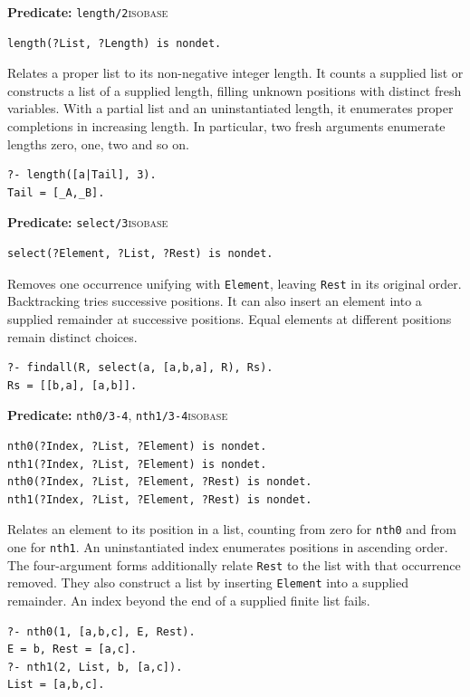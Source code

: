 \par{}
\noindent \textbf{Predicate:} \texttt{length/2}\hfill\textsc{isobase}
\begin{verbatim}
length(?List, ?Length) is nondet.
\end{verbatim}
\noindent Relates a proper list to its non-negative integer length. It counts a
supplied list or constructs a list of a supplied length, filling unknown
positions with distinct fresh variables. With a partial list and an
uninstantiated length, it enumerates proper completions in increasing length.
In particular, two fresh arguments enumerate lengths zero, one, two and so on.
\begin{verbatim}
?- length([a|Tail], 3).
Tail = [_A,_B].
\end{verbatim}

\par{}
\noindent \textbf{Predicate:} \texttt{select/3}\hfill\textsc{isobase}
\begin{verbatim}
select(?Element, ?List, ?Rest) is nondet.
\end{verbatim}
\noindent Removes one occurrence unifying with \texttt{Element}, leaving
\texttt{Rest} in its original order. Backtracking tries successive positions.
It can also insert an element into a supplied remainder at successive positions.
Equal elements at different positions remain distinct choices.
\begin{verbatim}
?- findall(R, select(a, [a,b,a], R), Rs).
Rs = [[b,a], [a,b]].
\end{verbatim}

\par{}
\noindent \textbf{Predicate:} \texttt{nth0/3-4}, \texttt{nth1/3-4}\hfill\textsc{isobase}
\begin{verbatim}
nth0(?Index, ?List, ?Element) is nondet.
nth1(?Index, ?List, ?Element) is nondet.
nth0(?Index, ?List, ?Element, ?Rest) is nondet.
nth1(?Index, ?List, ?Element, ?Rest) is nondet.
\end{verbatim}
\noindent Relates an element to its position in a list, counting from zero for
\texttt{nth0} and from one for \texttt{nth1}. An uninstantiated index enumerates
positions in ascending order. The four-argument forms additionally relate
\texttt{Rest} to the list with that occurrence removed. They also construct a
list by inserting \texttt{Element} into a supplied remainder. An index beyond
the end of a supplied finite list fails.
\begin{verbatim}
?- nth0(1, [a,b,c], E, Rest).
E = b, Rest = [a,c].
?- nth1(2, List, b, [a,c]).
List = [a,b,c].
\end{verbatim}

